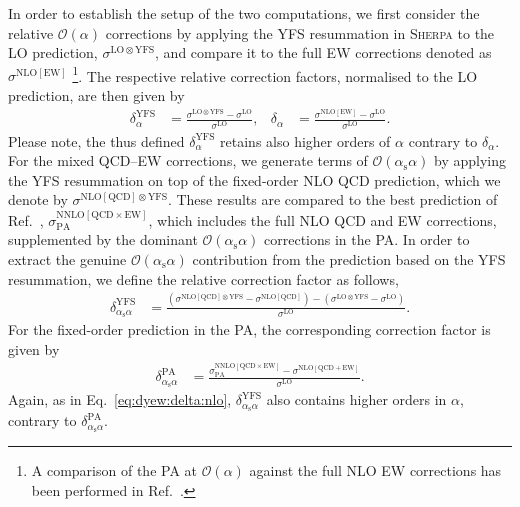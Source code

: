 \documentclass[11pt]{cernrep}
\newcommand{\order}{\ensuremath{\mathcal{O}}}
\newcommand{\alphas}{\ensuremath{\alpha_\mathrm{s}}}
\newcommand{\rLO}{\ensuremath{\mathrm{LO}}}
\newcommand{\rNLO}{\ensuremath{\mathrm{NLO}}}
\newcommand{\rNNLO}{\ensuremath{\mathrm{NNLO}}}
\newcommand{\rQCD}{\ensuremath{\mathrm{QCD}}}
\newcommand{\rEW}{\ensuremath{\mathrm{EW}}}
\newcommand{\rYFS}{\ensuremath{\mathrm{YFS}}}
\newcommand{\rPA}{\ensuremath{\mathrm{PA}}}
\begin{document}
In order to establish the setup of the two computations, we first 
consider the relative $\order(\alpha)$ corrections by applying 
the YFS resummation in \textsc{Sherpa} to the LO prediction, 
$\sigma^{\rLO\otimes\rYFS}$, and compare it to the full 
EW corrections denoted as $\sigma^{\rNLO[\rEW]}$%
\footnote{
  A comparison of the PA at $\order(\alpha)$ against the full 
  NLO EW corrections has been performed in Ref.~\cite{Dittmaier:2014qza}.
}.
The respective relative correction factors, normalised to the LO 
prediction, are then given by
\begin{align}
  \label{eq:dyew:delta:nlo}
  \delta_\alpha^\rYFS &= 
  \frac{\sigma^{\rLO\otimes\rYFS} - \sigma^\rLO}{\sigma^\rLO}
  , &
  \delta_\alpha &= 
  \frac{\sigma^{\rNLO[\rEW]} - \sigma^\rLO}{\sigma^\rLO}
  .
\end{align}
Please note, the thus defined $\delta_\alpha^\rYFS$ retains also 
higher orders of $\alpha$ contrary to $\delta_\alpha$. For the 
mixed QCD--EW corrections, we generate terms of $\order(\alphas\alpha)$ 
by applying the YFS resummation on top of the fixed-order NLO QCD 
prediction, which we denote by $\sigma^{\rNLO[\rQCD]\otimes\rYFS}$.
These results are compared to the best prediction of 
Ref.~\cite{Dittmaier:2015rxo}, $\sigma^{\rNNLO[\rQCD\times\rEW]}_{\rPA}$, 
which includes the full NLO QCD and EW corrections, supplemented by 
the dominant $\order(\alphas\alpha)$ corrections in the PA. In order 
to extract the genuine $\order(\alphas\alpha)$ contribution from the 
prediction based on the YFS resummation, we define the relative 
correction factor as follows,
\begin{align}
  \label{eq:dyew:delta:nnlo:yfs}
  \delta_{\alphas\alpha}^\rYFS &= 
  \frac{ (\sigma^{\rNLO[\rQCD]\otimes\rYFS} - \sigma^{\rNLO[\rQCD]}) 
        -(\sigma^{\rLO\otimes\rYFS} - \sigma^\rLO)}
       {\sigma^\rLO} .
\end{align}
For the fixed-order prediction in the PA, the corresponding correction 
factor is given by
\begin{align}
  \label{eq:dyew:delta:nnlo:pa}
  \delta_{\alphas\alpha}^\rPA &= 
    \frac{\sigma^{\rNNLO[\rQCD\times\rEW]}_{\rPA} - \sigma^{\rNLO[\rQCD+\rEW]}}
       {\sigma^\rLO} .
\end{align}
Again, as in Eq.~\ref{eq:dyew:delta:nlo}, $\delta_{\alphas\alpha}^\rYFS$ 
also contains higher orders in $\alpha$, contrary to 
$\delta_{\alphas\alpha}^\rPA$.
\end{document}
